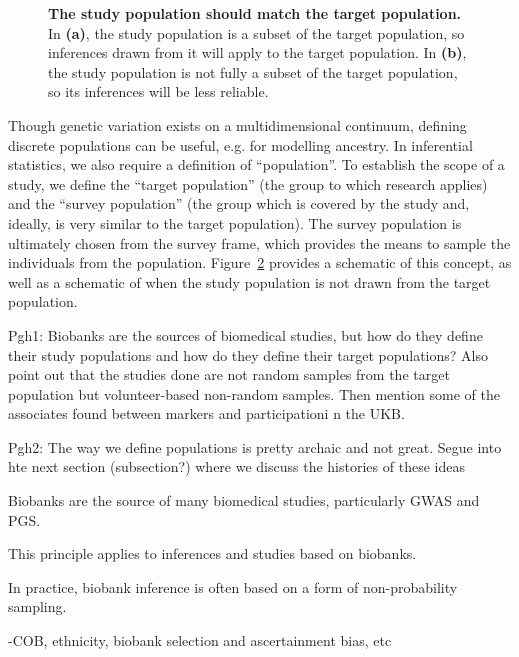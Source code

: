 \begin{figure}[h]
\begin{subfigure}{0.45\linewidth}
    \caption{}
    \label{fig:statistical_populations2}
\end{subfigure}
\caption[The relationship between target and study populations]{\textbf{The study population should match the target population.} In \textbf{(a)}, the study population is a subset of the target population, so inferences drawn from it will apply to the target population. In \textbf{(b)}, the study population is not fully a subset of the target population, so its inferences will be less reliable.}
\label{fig:statistical_populations}
\end{figure}

Though genetic variation exists on a multidimensional continuum, defining discrete populations can be useful, e.g. for modelling ancestry\citep{pritchard_inference_2000}. In inferential statistics, we also require a definition of ``population''\citep{statcan2003}. To establish the scope of a study, we define the ``target population'' (the group to which research applies) and the ``survey population'' (the group which is covered by the study and, ideally, is very similar to the target population). The survey population is ultimately chosen from the survey frame, which provides the means to sample the individuals from the population. Figure~\ref{fig:statistical_populations} provides a schematic of this concept, as well as a schematic of when the study population is not drawn from the target population.



Pgh1: Biobanks are the sources of biomedical studies, but how do they define their study populations and how do they define their target populations? Also point out that the studies done are not random samples from the target population but volunteer-based non-random samples. Then mention some of the associates found between markers and participationi n the UKB.

Pgh2: The way we define populations is pretty archaic and not great. Segue into hte next section (subsection?) where we discuss the histories of these ideas

Biobanks are the source of many biomedical studies, particularly GWAS and PGS. 

This principle applies to inferences and studies based on biobanks. 

In practice, biobank inference is often based on a form of non-probability sampling. 

-COB, ethnicity, biobank selection and ascertainment bias, etc

